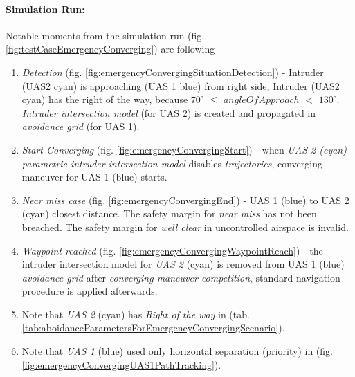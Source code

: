 \paragraph{Simulation Run:} Notable moments from the simulation run (fig. \ref{fig:testCaseEmergencyConverging}) are following
\begin{enumerate}
    \item \emph{Detection} (fig. \ref{fig:emergencyConvergingSituationDetection}) - Intruder (UAS2 cyan) is approaching (UAS 1 blue) from right side, Intruder (UAS2 cyan) has the right of the way, because $70^{\circ}$ $\le$ $angleOfApproach$ $<$ $130^{\circ}$. \emph{Intruder intersection model} (for UAS 2) is created and propagated in \emph{avoidance grid} (for UAS 1). 
            
    \item \emph{Start Converging} (fig. \ref{fig:emergencyConvergingStart}) - when \emph{UAS 2 (cyan) parametric intruder intersection model} disables \emph{trajectories}, converging maneuver for UAS 1 (blue) starts.
    
    \item \emph{Near miss case} (fig. \ref{fig:emergencyConvergingEnd}) - UAS 1 (blue) to UAS 2 (cyan) closest distance. The safety margin for \emph{near miss} has not been breached. The safety margin for \emph{well clear} in uncontrolled airspace is invalid.
    
    \item \emph{Waypoint reached} (fig. \ref{fig:emergencyConvergingWaypointReach}) - the intruder intersection model for \emph{UAS 2} (cyan) is removed from UAS 1 (blue) \emph{avoidance grid} after \emph{converging maneuver competition}, standard navigation procedure is applied afterwards.
    
    \item Note that \emph{UAS 2} (cyan) has \emph{Right of the way} in (tab. \ref{tab:aboidanceParametersForEmergencyConvergingScenario}).
    
    \item Note that \emph{UAS 1} (blue) used only horizontal separation (priority) in (fig. \ref{fig:emergencyConvergingUAS1PathTracking}).
\end{enumerate}


